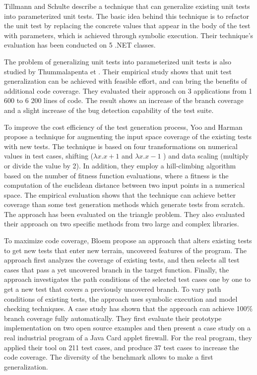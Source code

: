 Tillmann and Schulte \cite{tillmann2006unit} describe a technique that can generalize existing unit tests into parameterized unit tests. 
The basic idea behind this technique is to refactor the unit test by replacing the concrete values that appear in the body of the test with parameters, which is achieved through symbolic execution. 
Their technique's evaluation has been conducted on 5 .NET classes.

The problem of generalizing unit tests into parameterized unit tests is also studied by Thummalapenta et \etal\cite{marri2010retrofitting}. 
Their empirical study shows that unit test generalization can be achieved with feasible effort, and can bring the benefits of additional code coverage.
They evaluated their approach on 3 applications from 1 600 to 6 200 lines of code. 
The result shows an increase of the branch coverage and a slight increase of the bug detection capability of the test suite.

To improve the cost efficiency of the test generation process, Yoo and Harman \cite{yoo2012} propose a technique for augmenting the input space coverage of the existing tests with new tests. 
The technique is based on four transformations on numerical values in test cases, \ie shifting ($\lambda x.x+1$ and  $\lambda x.x-1$ ) and data scaling (multiply or divide the value by 2).
In addition, they employ a hill-climbing algorithm based on the number of fitness function evaluations, where a fitness is the computation of the euclidean distance between two input points in a numerical space. 
The empirical evaluation shows that the technique can achieve better coverage than some test generation methods which generate tests from scratch.
The approach has been evaluated  on the triangle problem.
They also evaluated their approach on two specific methods from two large and complex libraries.

To maximize code coverage, Bloem \etal \cite{6958388} propose an approach that alters existing tests to get new tests that enter new terrain, \ie uncovered features of the program.
The approach first analyzes the coverage of existing tests, and then selects all test cases that pass a yet uncovered branch in the target function.
Finally, the approach investigates the path conditions of the selected test cases one by one to get a new test that covers a previously uncovered branch. 
To vary path conditions of existing tests, the approach uses symbolic execution and model checking techniques. 
A case study has shown that the approach can achieve 100\% branch coverage fully automatically.
They first evaluate their prototype implementation on two open source examples and then present a case study on a real industrial program of a Java Card applet firewall.
For the real program, they applied their tool on 211 test cases, and produce 37 test cases to increase the code coverage.
The diversity of the benchmark allows to make a first generalization.

